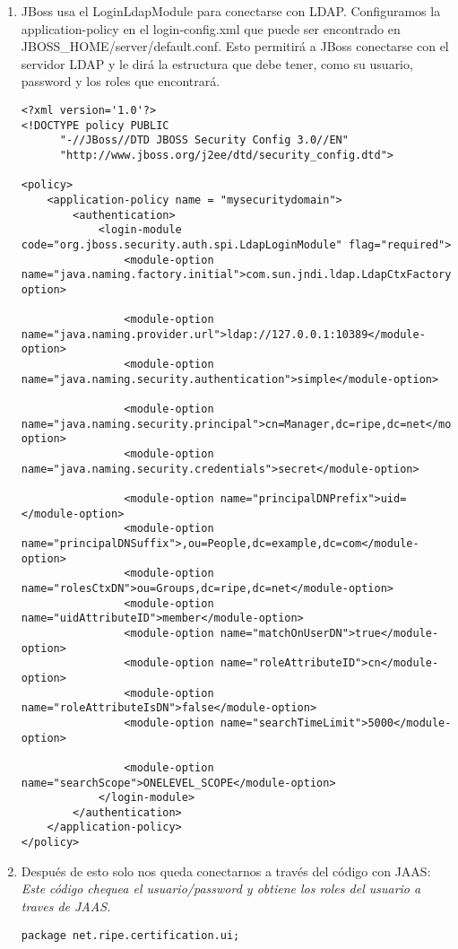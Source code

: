 	\begin{enumerate}
			\item JBoss usa el LoginLdapModule para conectarse con LDAP.
			Configuramos la application-policy en el login-config.xml que puede ser encontrado en JBOSS\_HOME/server/default.conf. Esto permitirá a JBoss conectarse con el servidor LDAP y le dirá la estructura que debe tener, como su usuario, password y los roles que encontrará.
\begin{lstlisting}
<?xml version='1.0'?>
<!DOCTYPE policy PUBLIC
      "-//JBoss//DTD JBOSS Security Config 3.0//EN"
      "http://www.jboss.org/j2ee/dtd/security_config.dtd">

<policy>
	<application-policy name = "mysecuritydomain">
	    <authentication>
	        <login-module code="org.jboss.security.auth.spi.LdapLoginModule" flag="required">
	            <module-option name="java.naming.factory.initial">com.sun.jndi.ldap.LdapCtxFactory</module-option>
	
	            <module-option name="java.naming.provider.url">ldap://127.0.0.1:10389</module-option>
	            <module-option name="java.naming.security.authentication">simple</module-option>
	
				<module-option name="java.naming.security.principal">cn=Manager,dc=ripe,dc=net</module-option>
				<module-option name="java.naming.security.credentials">secret</module-option>
				
	            <module-option name="principalDNPrefix">uid=</module-option>
	            <module-option name="principalDNSuffix">,ou=People,dc=example,dc=com</module-option>
	            <module-option name="rolesCtxDN">ou=Groups,dc=ripe,dc=net</module-option>
	            <module-option name="uidAttributeID">member</module-option>
	            <module-option name="matchOnUserDN">true</module-option>
	            <module-option name="roleAttributeID">cn</module-option>
	            <module-option name="roleAttributeIsDN">false</module-option>
	            <module-option name="searchTimeLimit">5000</module-option>
	
	            <module-option name="searchScope">ONELEVEL_SCOPE</module-option>
	        </login-module>
	    </authentication>
	</application-policy>
</policy>
\end{lstlisting}
			\item Después de esto solo nos queda conectarnos a través del código con JAAS:\\
			\textit{Este código chequea el usuario/password y obtiene los roles del usuario a traves de JAAS.}
\begin{lstlisting}
package net.ripe.certification.ui;


\end{lstlisting}
\end{enumerate}
